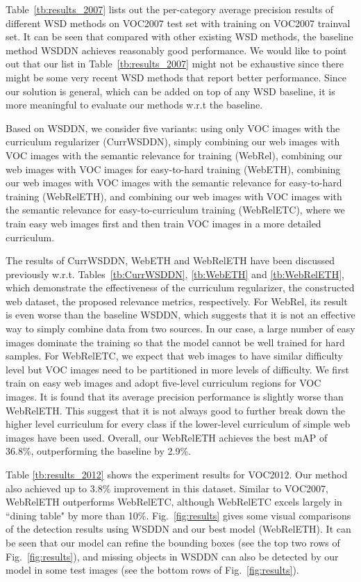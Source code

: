 \documentclass[10pt,twocolumn,letterpaper]{article}
\begin{document}
Table~\ref{tb:results_2007} lists out the per-category average precision results of different WSD methods on VOC2007 test set with training on VOC2007 trainval set. It can be seen that compared with other existing WSD methods, the baseline method WSDDN achieves reasonably good performance. We would like to point out that our list in Table~\ref{tb:results_2007} might not be exhaustive since there might be some very recent WSD methods that report better performance. Since our solution is general, which can be added on top of any WSD baseline, it is more meaningful to evaluate our methods w.r.t the baseline.  

Based on WSDDN, we consider five variants: using only VOC images with the curriculum regularizer (CurrWSDDN), simply combining our web images with VOC images with the semantic relevance for training (WebRel), combining our web images with VOC images for easy-to-hard training (WebETH), combining our web images with VOC images with the semantic relevance for easy-to-hard training (WebRelETH), and combining our web images with VOC images with the semantic relevance for easy-to-curriculum training (WebRelETC), where we train easy web images first and then train VOC images in a more detailed curriculum.

The results of CurrWSDDN, WebETH and WebRelETH have been discussed previously w.r.t. Tables~\ref{tb:CurrWSDDN}, \ref{tb:WebETH} and \ref{tb:WebRelETH}, which demonstrate the effectiveness of the curriculum regularizer, the constructed web dataset, the proposed relevance metrics, respectively. For WebRel, its result is even worse than the baseline WSDDN, which suggests that it is not an effective way to simply combine data from two sources. In our case, a large number of easy images dominate the training so that the model cannot be well trained for hard samples. For WebRelETC, we expect that web images to have similar difficulty level but VOC images need to be partitioned in more levels of difficulty. We first train on easy web images and adopt five-level curriculum regions for VOC images. It is found that its average precision performance is slightly worse than WebRelETH. This suggest that it is not always good to further break down the higher level curriculum for every class if the lower-level curriculum of simple web images have been used. Overall, our WebRelETH achieves the best mAP of 36.8\%, outperforming the baseline by 2.9\%.

Table \ref{tb:results_2012} shows the experiment results for VOC2012. Our method also achieved up to 3.8\% improvement in this dataset. Similar to VOC2007, WebRelETH outperforms WebRelETC, although WebRelETC excels largely in ``dining table" by more than 10\%. Fig.~\ref{fig:results} gives some visual comparisons of the detection results using WSDDN and our best model (WebRelETH). It can be seen that our model can refine the bounding boxes (see the top two rows of Fig.~\ref{fig:results}), and missing objects in WSDDN can also be detected by our model in some test images (see the bottom rows of Fig.~\ref{fig:results}).
\end{document}
